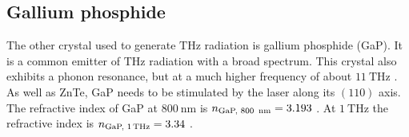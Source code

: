 \subsection{Gallium phosphide}
The other crystal used to generate $\si{\tera\hertz}$ radiation is gallium phosphide (GaP).
It is a common emitter of $\si{\tera\hertz}$ radiation with a broad spectrum.
This crystal also exhibits a phonon resonance, but at a much higher frequency of about $\SI{11}{\tera\hertz}$ \cite{phonon_GaP}.
As well as ZnTe, GaP needs to be stimulated by the laser along its $(110)$ axis.
The refractive index of GaP at $\SI{800}{\nano\meter}$ is $n_\text{GaP, 800\, nm} = 3.193$ \cite{refractive_index_gap}.
At $\SI{1}{\tera\hertz}$ the refractive index is $n_\text{GaP, 1\,THz} = 3.34$ \cite{hebling2004tunable}.



